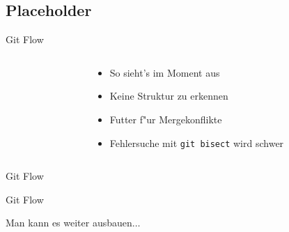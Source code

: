 \documentclass{beamer}
\begin{document}
\subsection{Placeholder}
\begin{frame}{Git Flow}
	\begin{columns}[T] %
		\begin{column}{.33\textwidth}
			\resizebox{!}{.8\textheight}{
					
			}
		\end{column}
		\hfill
		\begin{column}{.67\textwidth}
			\vfill
			\begin{itemize}[<+->]
				\item So sieht's im Moment aus
				\item Keine Struktur zu erkennen
				\item Futter f"ur Mergekonflikte
				\item Fehlersuche mit \texttt{git bisect} wird schwer
			\end{itemize}
		\end{column}
	\end{columns}
\end{frame}

\begin{frame}{Git Flow}
	\begin{center}
		\resizebox{!}{.8\textheight}{
			
		}
	\end{center}
\end{frame}

\begin{frame}{Git Flow}
	\begin{center}
		Man kann es weiter ausbauen$\ldots$
		\resizebox{!}{.8\textheight}{
			
		}
	\end{center}
\end{frame}
\end{document}
